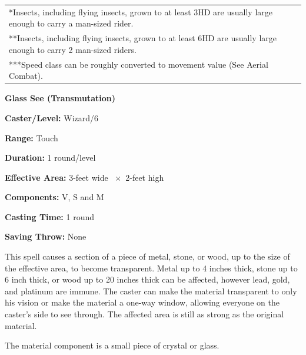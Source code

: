 \noindent\begin{tabular}{p{}}
*Insects, including flying insects, grown to at least 3HD are usually large enough to carry a man-sized rider. \\
**Insects, including flying insects, grown to at least 6HD are usually large enough to carry 2 man-sized riders. \\
***Speed class can be roughly converted to movement value (See Aerial Combat). \\
\end{tabular}\vspace{.5em}

\begin{multicols}{2}

\vspace{1em}

\noindent
\begin{minipage}{\columnwidth}

\noindent \textbf{Glass See (Transmutation)}

\noindent \textbf{Caster/Level:} Wizard/6

\noindent \textbf{Range:} Touch

\noindent \textbf{Duration:} 1 round/level

\noindent \textbf{Effective Area:} 3-feet wide ~$\times$~2-feet high

\noindent \textbf{Components:} V, S and M

\noindent \textbf{Casting Time:} 1 round

\noindent \textbf{Saving Throw:} None

\end{minipage}

This spell causes a section of a piece of metal, stone, or wood, up to the size of the effective area, to become transparent.  Metal up to 4 inches thick, stone up to 6 inch thick, or wood up to 20 inches thick can be affected, however lead, gold, and platinum are immune. The caster can make the material transparent to only his vision or make the material a one-way window, allowing everyone on the caster's side to see through.  The affected area is still as strong as the original material.

The material component is a small piece of crystal or glass.
 
\vspace{1em}

\noindent
\begin{minipage}{\columnwidth}


\end{minipage}
\end{multicols}

